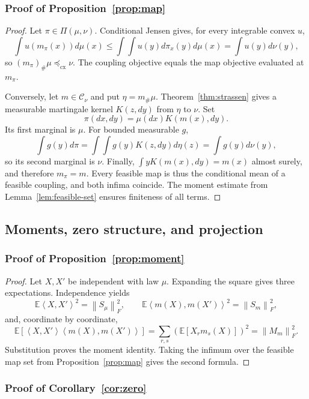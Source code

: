 \documentclass[11pt]{article}
\newcommand{\E}{\mathbb E}
\newcommand{\ip}[2]{\left\langle #1,#2\right\rangle}
\newcommand{\norm}[1]{\left\lVert #1\right\rVert}
\newcommand{\cx}{\preceq_{\mathrm{cx}}}
\theoremstyle{plain}
\theoremstyle{definition}
\theoremstyle{remark}
\begin{document}
\subsubsection{Proof of Proposition~\ref{prop:map}}\label{proof:4.4}

\begin{proof}
Let $\pi\in\Pi(\mu,\nu)$.  Conditional Jensen gives, for every integrable convex
$u$,
\[
 \int u(m_\pi(x))d\mu(x)
 \le\int\!\int u(y)d\pi_x(y)d\mu(x)=\int u(y)d\nu(y),
\]
so $(m_\pi)_\#\mu\cx\nu$.  The coupling objective equals the map objective
evaluated at $m_\pi$.

Conversely, let $m\in\mathcal C_\nu$ and put $\eta=m_\#\mu$.
Theorem~\ref{thm:strassen} gives a measurable martingale kernel $K(z,dy)$ from
$\eta$ to $\nu$.
Set
\[
 \pi(dx,dy)=\mu(dx)K(m(x),dy).
\]
Its first marginal is $\mu$.  For bounded measurable $g$,
\[
 \int g(y)d\pi=\int\!\int g(y)K(z,dy)d\eta(z)=\int g(y)d\nu(y),
\]
so its second marginal is $\nu$.  Finally,
$\int yK(m(x),dy)=m(x)$ almost surely, and therefore $m_\pi=m$.  Every feasible
map is thus the conditional mean of a feasible coupling, and both infima coincide.
The moment estimate from Lemma~\ref{lem:feasible-set} ensures finiteness of all
terms.
\end{proof}

\subsection{Moments, zero structure, and projection}

\subsubsection{Proof of Proposition~\ref{prop:moment}}\label{proof:5.1}

\begin{proof}
Let $X,X'$ be independent with law $\mu$.  Expanding the square gives three
expectations.  Independence yields
\[
 \E\ip{X}{X'}^2=\norm{S_\mu}_F^2,\qquad
 \E\ip{m(X)}{m(X')}^2=\norm{S_m}_F^2,
\]
and, coordinate by coordinate,
\[
 \E[\ip{X}{X'}\ip{m(X)}{m(X')}]
 =\sum_{r,s}(\E[X_rm_s(X)])^2=\norm{M_m}_F^2.
\]
Substitution proves the moment identity.  Taking the infimum over the feasible map
set from Proposition~\ref{prop:map} gives the second formula.
\end{proof}

\subsubsection{Proof of Corollary~\ref{cor:zero}}\label{proof:5.2}
\end{document}
